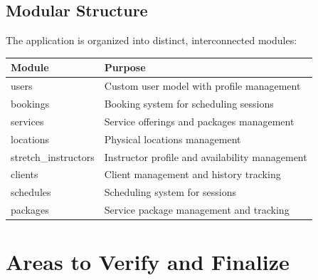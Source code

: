 \documentclass[11pt,a4paper]{report}
\begin{document}
\section{Modular Structure}

The application is organized into distinct, interconnected modules:

\begin{longtable}{>{\raggedright}p{}>{\raggedright\arraybackslash}p{}}
\toprule
\textbf{Module} & \textbf{Purpose} \\
\midrule
\endhead
users & Custom user model with profile management \\
bookings & Booking system for scheduling sessions \\
services & Service offerings and packages management \\
locations & Physical locations management \\
stretch\_instructors & Instructor profile and availability management \\
clients & Client management and history tracking \\
schedules & Scheduling system for sessions \\
packages & Service package management and tracking \\
\bottomrule
\end{longtable}

\chapter{Areas to Verify and Finalize}
\end{document}
